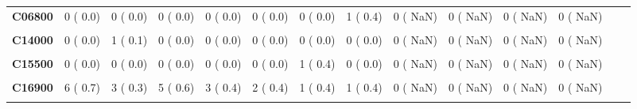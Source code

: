 \documentclass[
]{article}
\begin{document}
\begin{table}[H]
\begin{tabular}[t]{>{\raggedright\arraybackslash}p{5em}ccccccccccccc}
\textbf{C06800} & 0 (  0.0) & 0 (  0.0) & 0 (  0.0) & 0 (  0.0) & 0 (  0.0) & 0 (  0.0) & 1 (  0.4) & 0 (  NaN) & 0 (  NaN) & 0 (  NaN) & 0 (  NaN) &  & \\
\textbf{\cellcolor{gray!10}{C07000}} & \cellcolor{gray!10}{1 (  0.1)} & \cellcolor{gray!10}{0 (  0.0)} & \cellcolor{gray!10}{0 (  0.0)} & \cellcolor{gray!10}{1 (  0.1)} & \cellcolor{gray!10}{0 (  0.0)} & \cellcolor{gray!10}{0 (  0.0)} & \cellcolor{gray!10}{0 (  0.0)} & \cellcolor{gray!10}{0 (  NaN)} & \cellcolor{gray!10}{0 (  NaN)} & \cellcolor{gray!10}{0 (  NaN)} & \cellcolor{gray!10}{0 (  NaN)} & \cellcolor{gray!10}{} & \cellcolor{gray!10}{}\\
\textbf{C14000} & 0 (  0.0) & 1 (  0.1) & 0 (  0.0) & 0 (  0.0) & 0 (  0.0) & 0 (  0.0) & 0 (  0.0) & 0 (  NaN) & 0 (  NaN) & 0 (  NaN) & 0 (  NaN) &  & \\
\textbf{\cellcolor{gray!10}{C15100}} & \cellcolor{gray!10}{1 (  0.1)} & \cellcolor{gray!10}{0 (  0.0)} & \cellcolor{gray!10}{0 (  0.0)} & \cellcolor{gray!10}{0 (  0.0)} & \cellcolor{gray!10}{0 (  0.0)} & \cellcolor{gray!10}{0 (  0.0)} & \cellcolor{gray!10}{0 (  0.0)} & \cellcolor{gray!10}{0 (  NaN)} & \cellcolor{gray!10}{0 (  NaN)} & \cellcolor{gray!10}{0 (  NaN)} & \cellcolor{gray!10}{0 (  NaN)} & \cellcolor{gray!10}{} & \cellcolor{gray!10}{}\\
\textbf{C15500} & 0 (  0.0) & 0 (  0.0) & 0 (  0.0) & 0 (  0.0) & 0 (  0.0) & 1 (  0.4) & 0 (  0.0) & 0 (  NaN) & 0 (  NaN) & 0 (  NaN) & 0 (  NaN) &  & \\
\textbf{\cellcolor{gray!10}{C15900}} & \cellcolor{gray!10}{0 (  0.0)} & \cellcolor{gray!10}{4 (  0.4)} & \cellcolor{gray!10}{0 (  0.0)} & \cellcolor{gray!10}{2 (  0.3)} & \cellcolor{gray!10}{0 (  0.0)} & \cellcolor{gray!10}{0 (  0.0)} & \cellcolor{gray!10}{0 (  0.0)} & \cellcolor{gray!10}{0 (  NaN)} & \cellcolor{gray!10}{0 (  NaN)} & \cellcolor{gray!10}{0 (  NaN)} & \cellcolor{gray!10}{0 (  NaN)} & \cellcolor{gray!10}{} & \cellcolor{gray!10}{}\\
\textbf{C16900} & 6 (  0.7) & 3 (  0.3) & 5 (  0.6) & 3 (  0.4) & 2 (  0.4) & 1 (  0.4) & 1 (  0.4) & 0 (  NaN) & 0 (  NaN) & 0 (  NaN) & 0 (  NaN) &  & \\
\textbf{\cellcolor{gray!10}{C17000}} & \cellcolor{gray!10}{0 (  0.0)} & \cellcolor{gray!10}{1 (  0.1)} & \cellcolor{gray!10}{0 (  0.0)} & \cellcolor{gray!10}{0 (  0.0)} & \cellcolor{gray!10}{0 (  0.0)} & \cellcolor{gray!10}{0 (  0.0)} & \cellcolor{gray!10}{0 (  0.0)} & \cellcolor{gray!10}{0 (  NaN)} & \cellcolor{gray!10}{0 (  NaN)} & \cellcolor{gray!10}{0 (  NaN)} & \cellcolor{gray!10}{0 (  NaN)} & \cellcolor{gray!10}{} & \cellcolor{gray!10}{}\\

\end{tabular}
\end{table}
\end{document}
